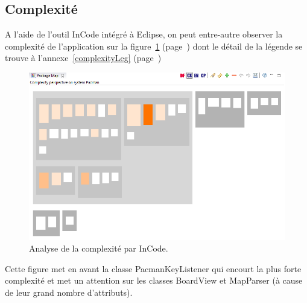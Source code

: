 \documentclass[12pt,a4paper,final]{article}
\newcommand{\annexe}[1]{annexe~\ref{#1} (page~\pageref{#1})}
\newcommand{\labelfigure}[1]{figure~\ref{#1} (page~\pageref{#1})}
\begin{document}
\subsection{Complexité}
A l'aide de l'outil InCode intégré à Eclipse, on peut entre-autre observer la complexité de l'application sur la \labelfigure{complexity} dont le détail de la légende se trouve à l'\annexe{complexityLeg}
\begin{figure}[!h]
	\centering
	\includegraphics[width=\textwidth]{InCodeComplexity.png}
	\caption{\label{complexity}Analyse de la complexité par InCode.}
\end{figure}
Cette figure met en avant la classe PacmanKeyListener qui encourt la plus forte complexité et met un attention sur les classes BoardView et MapParser (à cause de leur grand nombre d'attributs).

\end{document}
